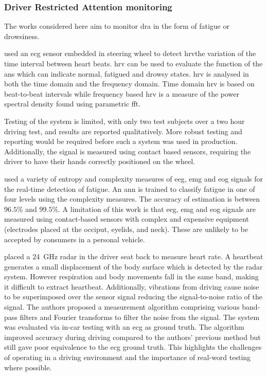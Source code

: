 \documentclass[11pt, parskip=half*,twoside=false]{scrbook}
\begin{document}
\subsubsection{Driver Restricted Attention monitoring}
The works considered here aim to monitor \gls{dra} in the form of fatigue or drowsiness.
 
\citet{jungDriverFatigueDrowsiness2014} used an \gls{ecg} sensor embedded in steering wheel to detect \gls{hrv}\textemdash the variation of the time interval between heart beats. \gls{hrv} can be used to evaluate the function of the \gls{ans} which can indicate normal, fatigued and drowsy states. \gls{hrv} is analysed in both the time domain and the frequency domain. Time domain \gls{hrv} is based on beat-to-beat intervals while frequency based \gls{hrv} is a measure of the power spectral density found using parametric \gls{fft}.

Testing of the system is limited, with only two test subjects over a two hour driving test, and results are reported qualitatively. More robust testing and reporting would be required before such a system was used in production. Additionally, the signal is measured using contact based sensors, requiring the driver to have their hands correctly positioned on the wheel. 
 
\citet{zhangAutomatedDetectionDriver2014} used a variety of entropy and complexity measures of \gls{eeg}, \gls{emg} and \gls{eog} signals for the real-time detection of fatigue. An \gls{ann} is trained to classify fatigue in one of four levels using the complexity measures. The accuracy of estimation is between $96.5\%$ and $99.5\%$. A limitation of this work is that \gls{eeg}, \gls{emg} and \gls{eog} signals are measured using contact-based sensors with complex and expensive equipment (electrodes placed at the occiput, eyelids, and neck). These are unlikely to be accepted by consumers in a personal vehicle.

\citet{tsuchiyaHeartbeatDetectionTechnology2020} placed a 24~GHz radar in the driver seat back to measure heart rate. A heartbeat generates a small displacement of the body surface which is detected by the radar system. However  respiration and body movements fall in the same band, making it difficult to extract heartbeat. Additionally, vibrations from driving cause noise to be superimposed over the sensor signal reducing the signal-to-noise ratio of the signal. The authors proposed a measurement algorithm comprising various band-pass filters and Fourier transforms to filter the noise from the signal. The system was evaluated via in-car testing with an \gls{ecg} as ground truth. The algorithm improved accuracy during driving compared to the authors' previous method but still gave poor equivalence to the \gls{ecg} ground truth. This highlights the challenges of operating in a driving environment and the importance of real-word testing where possible. 
\end{document}
